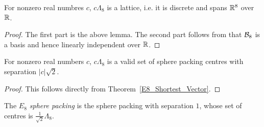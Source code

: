 \begin{lemma}\label{instLatticeE8}\leanok
  For nonzero real numbres $c$, $c\Lambda_8$ is a lattice, i.e. it is discrete and spans $\mathbb{R}^8$ over $\mathbb{R}$.
\end{lemma}
\begin{proof}\leanok
  The first part is the above lemma. The second part follows from that $\mathcal{B}_8$ is a basis and hence linearly independent over $\mathbb{R}$.
\end{proof}

\begin{lemma}\label{instSpherePackingE8ScaledLattice}\leanok
  For nonzero real numbers $c$, $c\Lambda_8$ is a valid set of sphere packing centres with separation $|c|\sqrt{2}$.
\end{lemma}
\begin{proof}
  This follows directly from Theorem~\ref{E8_Shortest_Vector}.
\end{proof}

\begin{definition}\label{E8_Packing}\leanok
  The \emph{$E_8$ sphere packing} is the sphere packing with separation $1$, whose set of centres is $\frac{1}{\sqrt{2}}\Lambda_8$.
\end{definition}


